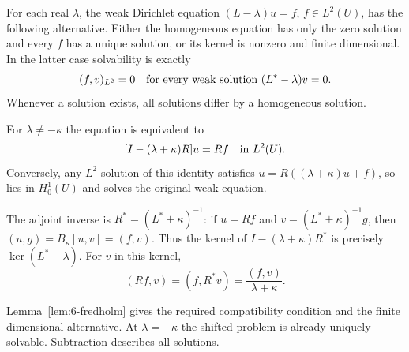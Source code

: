 \begin{theorem}\label{thm:6-fredholm-pde}
For each real $\lambda$, the weak Dirichlet equation
$(L-\lambda)u=f$, $f\in L^2(U)$, has the following alternative.
Either the homogeneous equation has only the zero solution and every
$f$ has a unique solution, or its kernel is nonzero and finite dimensional.
In the latter case solvability is exactly
\[
 (f,v)_{L^2}=0
 \quad\hbox{for every weak solution }(L^*-\lambda)v=0.
\]
Whenever a solution exists, all solutions differ by a homogeneous solution.
\end{theorem}
\begin{expandedproof}
For $\lambda\ne-\kappa$ the equation is equivalent to
\begin{equation}\label{eq:6-resolvent}
 [I-(\lambda+\kappa)R]u=Rf
 \quad\hbox{in }L^2(U).
\end{equation}
Conversely, any $L^2$ solution of this identity satisfies
$u=R((\lambda+\kappa)u+f)$, so lies in $H^1_0(U)$ and solves the
original weak equation.

The adjoint inverse is $R^*=(L^*+\kappa)^{-1}$: if $u=Rf$ and
$v=(L^*+\kappa)^{-1}g$, then
$(u,g)=B_\kappa[u,v]=(f,v)$.
Thus the kernel of $I-(\lambda+\kappa)R^*$ is precisely
$\ker(L^*-\lambda)$. For $v$ in this kernel,
\[
 (Rf,v)=(f,R^*v)=\frac{(f,v)}{\lambda+\kappa}.
\]

\Needspace{45mm}
Lemma~\ref{lem:6-fredholm} gives the required compatibility condition
and the finite dimensional alternative. At $\lambda=-\kappa$ the shifted
problem is already uniquely solvable. Subtraction describes all solutions.
\end{expandedproof}

\Needspace{35mm}
